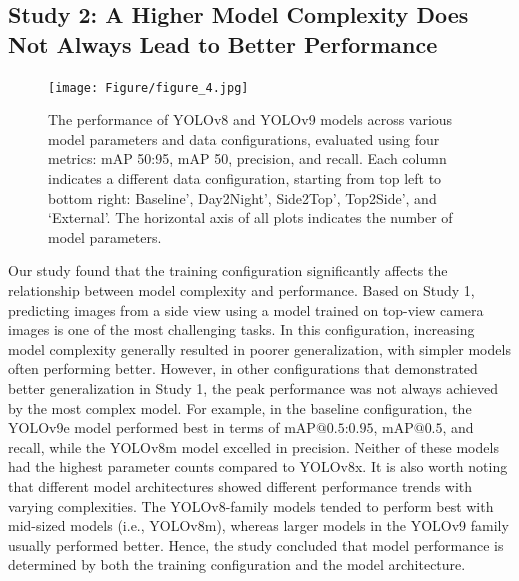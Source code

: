 
\subsection*{Study 2: A Higher Model Complexity Does Not Always Lead to Better Performance}

\begin{figure}[h]
\centering
\texttt{[image: Figure/figure\_4.jpg]}
\caption{The performance of YOLOv8 and YOLOv9 models across various model parameters and data configurations, evaluated using four metrics: mAP 50:95, mAP 50, precision, and recall. Each column indicates a different data configuration, starting from top left to bottom right: Baseline', Day2Night', Side2Top', Top2Side', and `External'. The horizontal axis of all plots indicates the number of model parameters.}
\label{fig:models}
\end{figure}

Our study found that the training configuration significantly affects the relationship between model complexity and performance. Based on Study 1, predicting images from a side view using a model trained on top-view camera images is one of the most challenging tasks. In this configuration, increasing model complexity generally resulted in poorer generalization, with simpler models often performing better. However, in other configurations that demonstrated better generalization in Study 1, the peak performance was not always achieved by the most complex model. For example, in the baseline configuration, the YOLOv9e model performed best in terms of $\text{mAP@{0.5:0.95}}$, $\text{mAP@{0.5}}$, and recall, while the YOLOv8m model excelled in precision. Neither of these models had the highest parameter counts compared to YOLOv8x. It is also worth noting that different model architectures showed different performance trends with varying complexities. The YOLOv8-family models tended to perform best with mid-sized models (i.e., YOLOv8m), whereas larger models in the YOLOv9 family usually performed better. Hence, the study concluded that model performance is determined by both the training configuration and the model architecture.

